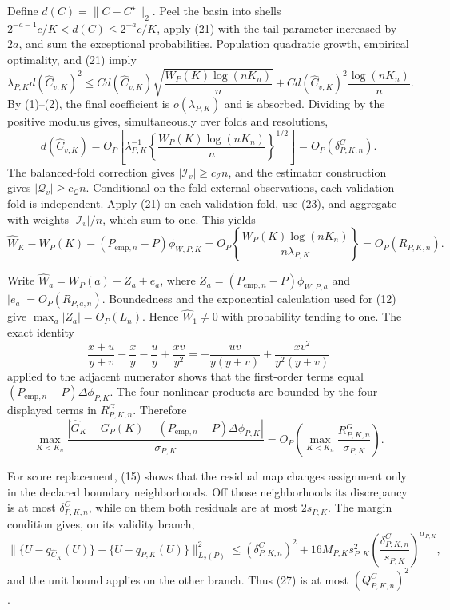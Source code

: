 Define \(d(C)=\|C-C^\star\|_2\).  Peel the basin into shells \(2^{-a-1}c/K<d(C)\leq2^{-a}c/K\), apply (21) with the tail parameter increased by \(2a\), and sum the exceptional probabilities.  Population quadratic growth, empirical optimality, and (21) imply
\[
 \lambda_{P,K}d(\widehat C_{v,K})^2
 \leq C d(\widehat C_{v,K})
 \sqrt{\frac{W_P(K)\log(nK_n)}n}
 +C d(\widehat C_{v,K})^2\frac{\log(nK_n)}n.                               \tag{22}
\]
By (1)--(2), the final coefficient is \(o(\lambda_{P,K})\) and is absorbed.  Dividing by the positive modulus gives, simultaneously over folds and resolutions,
\[
 d(\widehat C_{v,K})
 =O_P\!\left[\lambda_{P,K}^{-1}
 \left\{\frac{W_P(K)\log(nK_n)}n\right\}^{1/2}\right]
 =O_P(\delta^C_{P,K,n}).                                                     \tag{23}
\]
The balanced-fold correction gives \(|\mathcal I_v|\geq c_{\mathcal I}n\), and the estimator construction gives \(|\mathcal Q_v|\geq c_{\mathcal Q}n\).  Conditional on the fold-external observations, each validation fold is independent.  Apply (21) on each validation fold, use (23), and aggregate with weights \(|\mathcal I_v|/n\), which sum to one.  This yields
\[
 \widehat W_K-W_P(K)-(P_{\mathrm{emp},n}-P)\phi_{W,P,K}
 =O_P\!\left\{\frac{W_P(K)\log(nK_n)}{n\lambda_{P,K}}\right\}
 =O_P(R_{P,K,n}).                                                            \tag{24}
\]

Write \(\widehat W_a=W_P(a)+Z_a+e_a\), where \(Z_a=(P_{\mathrm{emp},n}-P)\phi_{W,P,a}\) and \(|e_a|=O_P(R_{P,a,n})\).  Boundedness and the exponential calculation used for (12) give \(\max_a|Z_a|=O_P(L_n)\).  Hence \(\widehat W_1\neq0\) with probability tending to one.  The exact identity
\[
 \frac{x+u}{y+v}-\frac xy-\frac uy+\frac{xv}{y^2}
 =-\frac{uv}{y(y+v)}+\frac{xv^2}{y^2(y+v)}                                  \tag{25}
\]
applied to the adjacent numerator shows that the first-order terms equal \((P_{\mathrm{emp},n}-P)\Delta\phi_{P,K}\).  The four nonlinear products are bounded by the four displayed terms in \(R^G_{P,K,n}\).  Therefore
\[
 \max_{K<K_n}\frac{|\widehat G_K-G_P(K)
 -(P_{\mathrm{emp},n}-P)\Delta\phi_{P,K}|}{\sigma_{P,K}}
 =O_P\!\left(\max_{K<K_n}\frac{R^G_{P,K,n}}{\sigma_{P,K}}\right).          \tag{26}
\]

For score replacement, (15) shows that the residual map changes assignment only in the declared boundary neighborhoods.  Off those neighborhoods its discrepancy is at most \(\delta^C_{P,K,n}\), while on them both residuals are at most \(2s_{P,K}\).  The margin condition gives, on its validity branch,
\[
 \|\{U-q_{\widehat C_K}(U)\}-\{U-q_{P,K}(U)\}\|_{L_2(P)}^2
 \leq(\delta^C_{P,K,n})^2
 +16M_{P,K}s_{P,K}^2
 \left(\frac{\delta^C_{P,K,n}}{s_{P,K}}\right)^{\alpha_{P,K}},             \tag{27}
\]
and the unit bound applies on the other branch.  Thus (27) is at most \((Q^C_{P,K,n})^2\).

